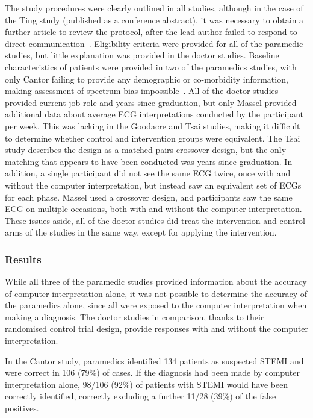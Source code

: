 The study procedures were clearly outlined in all studies, although in the case of the Ting study (published as a conference abstract), it was necessary to obtain a further article to review the protocol, after the lead author failed to respond to direct communication~\citep{nestler_impact_2011}. Eligibility criteria were provided for all of the paramedic studies, but little explanation was provided in the doctor studies. Baseline characteristics of patients were provided in two of the paramedics studies, with only Cantor failing to provide any demographic or co-morbidity information, making assessment of spectrum bias impossible~\citep{whiting_sources_2004}. All of the doctor studies provided current job role and years since graduation, but only Massel provided additional data about average ECG interpretations conducted by the participant per week. This was lacking in the Goodacre and Tsai studies, making it difficult to determine whether control and intervention groups were equivalent. The Tsai study describes the design as a matched pairs crossover design, but the only matching that appears to have been conducted was years since graduation. In addition, a single participant did not see the same ECG twice, once with and without the computer interpretation, but instead saw an equivalent set of ECGs for each phase. Massel used a crossover design, and participants saw the same ECG on multiple occasions, both with and without the computer interpretation. These issues aside, all of the doctor studies did treat the intervention and control arms of the studies in the same way, except for applying the intervention.

\subsubsection{Results}
\label{results}

While all three of the paramedic studies provided information about the accuracy of computer interpretation alone, it was not possible to determine the accuracy of the paramedics alone, since all were exposed to the computer interpretation when making a diagnosis. The doctor studies in comparison, thanks to their randomised control trial design, provide responses with and without the computer interpretation.

In the Cantor study, paramedics identified 134 patients as suspected STEMI and were correct in 106 (79\%) of cases. If the diagnosis had been made by computer interpretation alone, 98\slash 106 (92\%) of patients with STEMI would have been correctly identified, correctly excluding a further 11\slash 28 (39\%) of the false positives.

